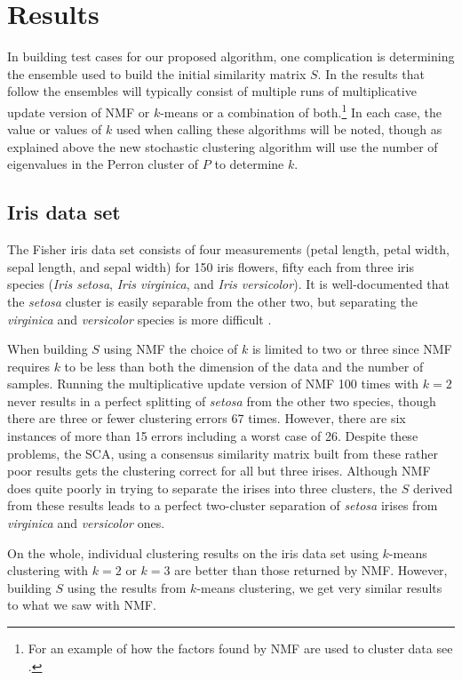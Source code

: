 \documentclass[final]{siamltex}
\begin{document}
\section{Results} \label{sec:res}
In building test cases for our proposed algorithm, one complication is determining the ensemble used to build the initial similarity matrix $S$. In the results that follow the ensembles will typically consist of multiple runs of multiplicative update version of NMF \cite{leeseung} or $k$-means or a combination of both.\footnote{For an example of how the factors found by NMF are used to cluster data see \cite{chartier2011nap}.} In each case, the value or values of $k$ used when calling these algorithms will be noted, though as explained above the new stochastic clustering algorithm will use the number of eigenvalues in the Perron cluster of $P$ to determine $k$.

\subsection{Iris data set}
The Fisher iris data set \cite{fisher} consists of four measurements (petal length, petal width, sepal length, and sepal width) for 150 iris flowers, fifty each from three iris species (\emph{Iris setosa}, \emph{Iris virginica}, and \emph{Iris versicolor}). It is well-documented that the \emph{setosa} cluster is easily separable from the other two, but separating the \emph{virginica} and \emph{versicolor} species is more difficult \cite{fredjain2002}.

When building $S$ using NMF the choice of $k$ is limited to two or three since NMF requires $k$ to be less than both the dimension of the data and the number of samples. Running the multiplicative update version of NMF 100 times with $k=2$ never results in a perfect splitting of \emph{setosa} from the other two species, though there are three or fewer clustering errors 67 times. However, there are six instances of more than 15 errors including a worst case of 26. Despite these problems, the SCA, using a consensus similarity matrix built from these rather poor results gets the clustering correct for all but three irises. Although NMF does quite poorly in trying to separate the irises into three clusters, the $S$ derived from these results leads to a perfect two-cluster separation of \emph{setosa} irises from \emph{virginica} and \emph{versicolor} ones. 

On the whole, individual clustering results on the iris data set using $k$-means clustering with $k=2$ or $k=3$ are better than those returned by NMF. However, building $S$ using the results from $k$-means clustering, we get very similar results to what we saw with NMF.
\end{document}
